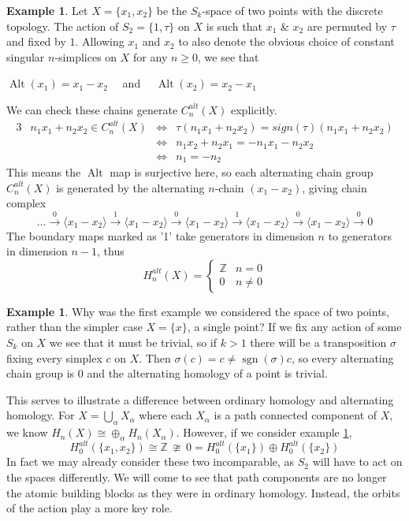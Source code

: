 \documentclass[11pt,a4paper,twoside]{article}
\theoremstyle{plain}
\theoremstyle{definition}
\theoremstyle{definition}
\theoremstyle{definition}
\theoremstyle{definition}
\newtheorem{example}[thm]{Example}
\theoremstyle{definition}
\DeclareMathOperator{\Alt}{Alt}
\DeclareMathOperator{\sgn}{sgn}
\begin{document}
\begin{example}
\label{twoPointSpace}
Let $X=\{x_1,x_2\}$ be the $S_k$-space of two points with the discrete topology. The action of $S_2=\{1,\tau\}$ on $X$ is such that $x_1$ \& $x_2$ are permuted by $\tau$ and fixed by $1$. Allowing $x_1$ and $x_2$ to also denote the obvious choice of constant singular $n$-simplices on $X$ for any $n\geq0$, we see that 
\begin{center}$\Alt(x_1)=x_1-x_2\quad$ and $\quad\Alt(x_2)=x_2-x_1$\end{center}
We can check these chains generate $C_n^{alt}(X)$ explicitly.
\begin{alignat*}{3}
&n_1x_1+n_2x_2\in C_n^{alt}(X) &\iff &\tau(n_1x_1+n_2x_2)=sign(\tau)(n_1x_1+n_2x_2)\\
&&\iff & n_1x_2+n_2x_1=-n_1x_1-n_2x_2\\
&&\iff & n_1 = -n_2
\end{alignat*}
This means the $\Alt$ map is surjective here, so each alternating chain group $C_n^{alt}(X)$ is generated by the alternating $n$-chain $(x_1-x_2)$, giving chain complex
$$\dots\overset{0}{\longrightarrow}\langle x_1-x_2\rangle\overset{1}{\longrightarrow}\langle x_1-x_2\rangle\overset{0}{\longrightarrow}\langle x_1-x_2\rangle\overset{1}{\longrightarrow}\langle x_1-x_2\rangle\overset{0}{\longrightarrow}\langle x_1-x_2\rangle\overset{0}{\longrightarrow}0$$ 
The boundary maps marked as '1' take generators in dimension $n$ to generators in dimension $n-1$, thus $$H_n^{alt}(X)=\begin{cases} \mathbb{Z}  & n=0\\0 & n\neq0 \end{cases}$$
\end{example}


\begin{example}
\label{onePointSpace}
Why was the first example we considered the space of two points, rather than the simpler case $X=\{x\}$, a single point? If we fix any action of some $S_k$ on $X$ we see that it must be trivial, so if $k>1$ there will be a transposition $\sigma$ fixing every simplex $c$ on $X$. Then  $\sigma(c)\!=\!c\!\neq\!\sgn(\sigma)c$, so every alternating chain group is $0$ and the alternating homology of a point is trivial.

This serves to illustrate a difference between ordinary homology and alternating homology. For $X=\bigcup_\alpha X_\alpha$ where each $X_\alpha$ is a path connected component of $X$, we know $H_n(X)\cong\oplus_\alpha H_n(X_\alpha)$. However, if we consider example \ref{twoPointSpace},
$$H_0^{alt}(\{x_1,x_2\})\cong\mathbb{Z}\,\ncong\,0= H_0^{alt}(\{x_1\})\oplus H_0^{alt}(\{x_2\})$$
In fact we may already consider these two incomparable, as $S_2$ will have to act on the spaces differently. We will come to see that path components are no longer the atomic building blocks as they were in ordinary homology. Instead, the orbits of the action play a more key role.
\end{example}
\end{document}

